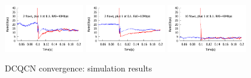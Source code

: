 \begin{figure}[t]
\center
\subfigure
{
\includegraphics[width=0.31\textwidth]{figures/dcqcn_converge_3.pdf}
\label{fig:dcqcn_convergence_sim_3}
}
\subfigure
{
\includegraphics[width=0.31\textwidth]{figures/dcqcn_converge_3rai.pdf}
\label{fig:dcqcn_convergence_sim_3rai}
}
\subfigure
{
\includegraphics[width=0.31\textwidth]{figures/dcqcn_converge_11.pdf}
\label{fig:dcqcn_convergence_sim_11}
}
\vspace{-1em}
\caption{DCQCN convergence: simulation results}
\vspace{-1em}
\label{fig:dcqcn_convergence_sim}
\end{figure}
\fi

